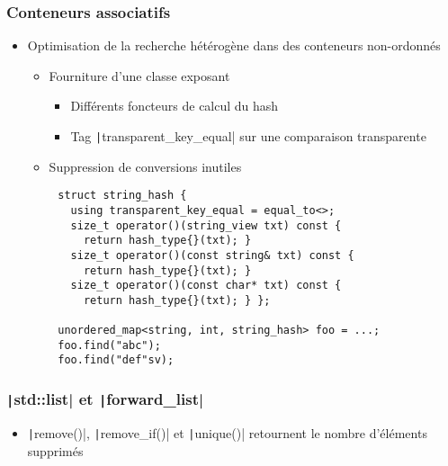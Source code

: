 \documentclass[C++.tex]{subfiles}
\begin{document}
\begin{frame}[fragile]
	\frametitle{Conteneurs associatifs}
	\begin{itemize}
		\item Optimisation de la recherche hétérogène dans des conteneurs non-ordonnés
		\begin{itemize}
			\item Fourniture d'une classe exposant
			\begin{itemize}
				\item Différents foncteurs de calcul du hash
				\item Tag \texttt|transparent_key_equal| sur une comparaison transparente
			\end{itemize}
			\item Suppression de conversions inutiles
		\end{itemize}
	\end{itemize}

	\begin{verbatim}
		struct string_hash {
		  using transparent_key_equal = equal_to<>;
		  size_t operator()(string_view txt) const {
		    return hash_type{}(txt); }
		  size_t operator()(const string& txt) const {
		    return hash_type{}(txt); }
		  size_t operator()(const char* txt) const {
		    return hash_type{}(txt); } };

		unordered_map<string, int, string_hash> foo = ...;
		foo.find("abc");
		foo.find("def"sv);
	\end{verbatim}

\end{frame}

\begin{frame}[fragile]
	\frametitle{\texttt|std::list| et \texttt|forward_list|}
	\begin{itemize}
		\item \texttt|remove()|, \texttt|remove_if()| et \texttt|unique()| retournent le nombre d'éléments supprimés
	\end{itemize}

\end{frame}
\end{document}
